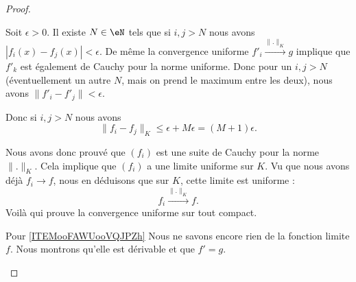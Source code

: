 \begin{proof}
\begin{subproof}
  Soit \( \epsilon>0\). Il existe \( N\in \eN\) tels que si \( i,j>N\) nous avons \( | f_i(x)-f_j(x) |<\epsilon\). De même la convergence uniforme \( f'_i\stackrel{\| . \|_K}{\longrightarrow} g\) implique que \( f'_k\) est également de Cauchy pour la norme uniforme. Donc pour un \( i,j>N\) (éventuellement un autre \( N\), mais on prend le maximum entre les deux), nous avons \( \| f'_i-f'_j \|<\epsilon\).

  Donc si \( i,j>N\) nous avons
  \begin{equation}
    \|f_i-f_j\|_K \leq \epsilon + M \epsilon=(M+1)\epsilon.
  \end{equation}

  Nous avons donc prouvé que \( (f_i)\) est une suite de Cauchy pour la norme \( \| . \|_K \). Cela implique que \( (f_i)\) a une limite uniforme sur \( K\). Vu que nous avons déjà \( f_i\to f\), nous en déduisons que sur \( K\), cette limite est uniforme :
  \begin{equation}
      f_i\stackrel{\| . \|_K}{\longrightarrow}f.
  \end{equation}
    Voilà qui prouve la convergence uniforme sur tout compact.

\item[Pour \ref{ITEMooFAWUooVQJPZh}]
    Nous ne savons encore rien de la fonction limite \( f\). Nous montrons qu'elle est dérivable et que \( f'=g\).
  

\end{subproof}
\end{proof}
